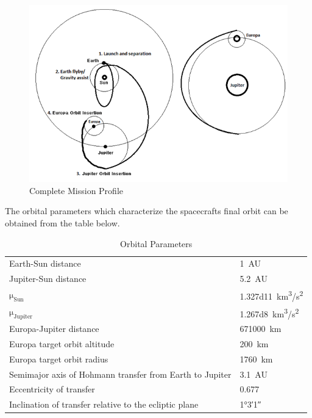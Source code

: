 \begin{figure}[H]
  \includegraphics[width=\textwidth]{Mission-Profile}
  \caption{Complete Mission Profile}
\end{figure}



The orbital parameters which characterize the spacecrafts final orbit
can be obtained from the table below.

\begin{longtable}{ll}
  \caption{Orbital Parameters \cite{JupiterFactSheet}} \\

  Earth-Sun distance & \SI{1}{AU} \\

  Jupiter-Sun distance & \SI{5.2}{AU} \\

  $\mathrm{\mu_{Sun}}$ & \SI{1.327d11}{km^3/s^2} \\

  $\mathrm{\mu_{Jupiter}}$ & \SI{1.267d8}{km^3/s^2} \\

  Europa-Jupiter distance & \SI{671000}{km} \\

  Europa target orbit altitude & \SI{200}{km} \\

  Europa target orbit radius & \SI{1760}{km} \\

  Semimajor axis of Hohmann transfer from Earth to Jupiter

  & \SI{3.1}{AU} \\

  Eccentricity of transfer & 0.677 \\

  Inclination of transfer relative to the ecliptic plane & \ang{1;3;1}
  \\
\end{longtable}


